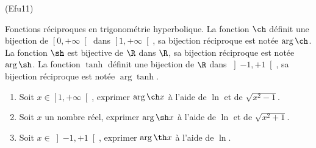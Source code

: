 \begin{tiny}(Efu11)\end{tiny} Fonctions r{\'e}ciproques en trigonom{\'e}trie hyperbolique.\newline
La fonction $\ch $ d{\'e}finit une bijection de $\left[ 0,+\infty
\right[ $ dans $\left[ 1,+\infty \right[ $, sa bijection r{\'e}ciproque est not{\'e}e $%
\arg \ch $. La fonction $\sh $ est bijective de $\R$ dans $\R$, sa bijection r{\'e}ciproque est not{\'e}e $\arg \sh $.
La fonction $\tanh $ d{\'e}finit une bijection de $\R$ dans
$\left] -1,+1\right[ $, sa bijection r{\'e}ciproque est not{\'e}e
$\arg \tanh $.

\begin{enumerate}
\item  Soit $x\in \left[ 1,+\infty \right[ $, exprimer $\arg \ch x$
{\`a} l'aide de $\ln $ et de $\sqrt{x^{2}-1}$.

\item  Soit $x$ un nombre r{\'e}el, exprimer $\arg \sh x$ {\`a} l'aide
de $\ln $ et de $\sqrt{x^{2}+1}$.

\item  Soit $x\in \left] -1,+1\right[ $, exprimer $\arg \th x$ {\`a}
l'aide de $\ln $.
\end{enumerate}